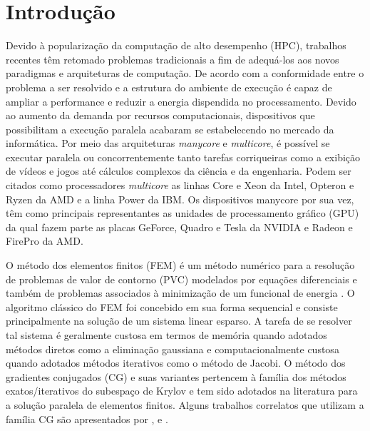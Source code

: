 \documentclass[
    12pt,               %
    openright,          %
    oneside,
    a4paper,            %
    english,            %
    french,             %
    spanish,            %
    brazil              %
    ]{abntex2}
\begin{document}
\textual

\chapter{Introdução}
	Devido à popularização da computação de alto desempenho (HPC), trabalhos recentes têm retomado problemas tradicionais a fim de adequá-los aos novos paradigmas e arquiteturas de computação. De acordo com  a conformidade entre o problema a ser resolvido e a estrutura do ambiente de execução é capaz de ampliar a performance e reduzir a energia dispendida no processamento.
	Devido ao aumento da demanda por recursos computacionais, dispositivos que possibilitam a execução paralela acabaram se estabelecendo no mercado da informática.
	Por meio das arquiteturas \textit{manycore} e \textit{multicore}, é possível se executar paralela ou concorrentemente tanto tarefas corriqueiras como a exibição de vídeos e jogos até cálculos complexos da ciência e da engenharia.
	Podem ser citados como processadores \textit{multicore} as linhas Core e Xeon da Intel\nocite{intel}, Opteron e Ryzen da AMD\nocite{amd} e a linha Power da IBM\nocite{ibm}. Os dispositivos manycore por sua vez, têm como principais representantes as unidades de processamento gráfico (GPU) da qual fazem parte as placas GeForce, Quadro e Tesla da NVIDIA\nocite{nvidia} e Radeon e FirePro da AMD\nocite{amd}.
	
	O método dos elementos finitos (FEM) é um método numérico para a resolução de problemas de valor de contorno (PVC) modelados por equações diferenciais e também de problemas associados à minimização de um funcional de energia \cite{Szabo2009}. O algoritmo clássico do FEM foi concebido em sua forma sequencial e consiste principalmente na solução de um sistema linear esparso. A tarefa de se resolver tal sistema é geralmente custosa em termos de memória quando adotados métodos diretos como a eliminação gaussiana e computacionalmente custosa quando adotados métodos iterativos como o método de Jacobi.
	O método dos gradientes conjugados (CG) e suas variantes pertencem à família dos métodos exatos/iterativos do subespaço de Krylov \cite{Anzt2016} e tem sido adotados na literatura para a solução paralela de elementos finitos. Alguns trabalhos correlatos que utilizam a família CG são apresentados por ,  e .
	
\end{document}
